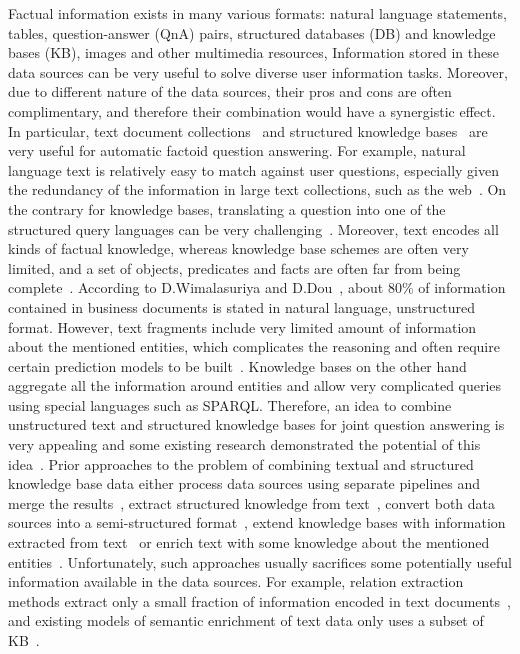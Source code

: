 Factual information exists in many various formats: natural language statements, tables, question-answer (QnA) pairs, structured databases (DB) and knowledge bases (KB), images and other multimedia resources, \etc
Information stored in these data sources can be very useful to solve diverse user information tasks.
Moreover, due to different nature of the data sources, their pros and cons are often complimentary, and therefore their combination would have a synergistic effect.
In particular, text document collections~\cite{Kolomiyets:2011:SQA:2046840.2047162} and structured knowledge bases~\cite{unger2014introduction} are very useful for automatic factoid question answering.
For example, natural language text is relatively easy to match against user questions, especially given the redundancy of the information in large text collections, such as the web~\cite{lin2007exploration}.
On the contrary for knowledge bases, translating a question into one of the structured query languages can be very challenging~\cite{BerantCFL13:sempre}.
Moreover, text encodes all kinds of factual knowledge, whereas knowledge base schemes are often very limited, and a set of objects, predicates and facts are often far from being complete~\cite{Dong:2014:KVW:2623330.2623623}.
According to D.Wimalasuriya and D.Dou~\cite{wimalasuriya2010ontology}, about 80\% of information contained in business documents is stated in natural language, \ie unstructured format.
However, text fragments include very limited amount of information about the mentioned entities, which complicates the reasoning and often require certain prediction models to be built~\cite{LiRoth02}.
Knowledge bases on the other hand aggregate all the information around entities and allow very complicated queries using special languages such as SPARQL.
Therefore, an idea to combine unstructured text and structured knowledge bases for joint question answering is very appealing and some existing research demonstrated the potential of this idea~\cite{elbassuoni2009language,fader2013paraphrase,ferrucci2010building,Sun:2015:ODQ:2736277.2741651,baudivs2015yodaqa}.
Prior approaches to the problem of combining textual and structured knowledge base data either process data sources using separate pipelines and merge the results~\cite{ferrucci2010building,baudivs2015yodaqa}, extract structured knowledge from text~\cite{Agichtein:2000:SER:336597.336644,MintzBSJ09,Dong:2014:KVW:2623330.2623623}, convert both data sources into a semi-structured format~\cite{Fader:2014:OQA:2623330.2623677}, extend knowledge bases with information extracted from text~\cite{elbassuoni2009language,yahya2016question} or 
enrich text with some knowledge about the mentioned entities~\cite{Sun:2015:ODQ:2736277.2741651}.
Unfortunately, such approaches usually sacrifices some potentially useful information available in the data sources.
For example, relation extraction methods extract only a small fraction of information encoded in text documents~\cite{Dong:2014:KVW:2623330.2623623}, and existing models of semantic enrichment of text data only uses a subset of KB~\cite{Sun:2015:ODQ:2736277.2741651}.

